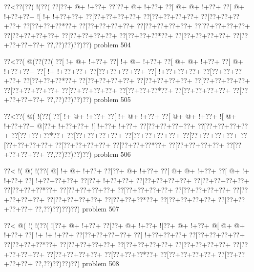 \vbox{\vbox{\goo
\0??<\0??(\0??(\- !(\0??(
\0??[\0??+\- @+\- !+\0??+
\0??[\0??+\- @+\- !+\0??+
\0??[\- @+\- @+\- !+\0??+
\0??[\- @+\- !+\0??+\0??+
\- ![\- !+\- !+\0??+\0??+
\0??[\0??+\0??+\0??+\0??+
\0??[\0??+\0??+\0??+\0??+
\0??[\0??+\0??+\0??+\0??+
\0??[\0??+\0??+\0??*\0??+
\0??[\0??+\0??+\0??+\0??+
\0??[\0??+\0??+\0??+\0??+
\0??[\0??+\0??+\0??+\0??+
\0??[\0??+\0??+\0??+\0??+
\0??[\0??+\0??+\0??+\0??+
\0??[\0??+\0??+\0??*\0??+
\0??[\0??+\0??+\0??+\0??+
\0??[\0??+\0??+\0??+\0??+
\0??,\0??)\0??)\0??)\0??)
}
\hfil problem 504\hfil\break
}

\vbox{\vbox{\goo
\0??<\0??(\- @(\0??(\0??(
\0??[\- !+\- @+\- !+\0??+
\0??[\- !+\- @+\- !+\0??+
\0??[\- @+\- @+\- !+\0??+
\0??[\- @+\- !+\0??+\0??+
\0??[\- !+\- !+\0??+\0??+
\0??[\0??+\0??+\0??+\0??+
\0??[\- !+\0??+\0??+\0??+
\0??[\0??+\0??+\0??+\0??+
\0??[\0??+\0??+\0??*\0??+
\0??[\0??+\0??+\0??+\0??+
\0??[\0??+\0??+\0??+\0??+
\0??[\0??+\0??+\0??+\0??+
\0??[\0??+\0??+\0??+\0??+
\0??[\0??+\0??+\0??+\0??+
\0??[\0??+\0??+\0??*\0??+
\0??[\0??+\0??+\0??+\0??+
\0??[\0??+\0??+\0??+\0??+
\0??,\0??)\0??)\0??)\0??)
}
\hfil problem 505\hfil\break
}

\vbox{\vbox{\goo
\0??<\0??(\- @(\- !(\0??(
\0??[\- !+\- @+\- !+\0??+
\0??[\- !+\- @+\- !+\0??+
\0??[\- @+\- @+\- !+\0??+
\- ![\- @+\- !+\0??+\0??+
\- @[\0??+\- !+\0??+\0??+
\- ![\- !+\0??+\- !+\0??+
\0??[\0??+\0??+\0??+\0??+
\0??[\0??+\0??+\0??+\0??+
\0??[\0??+\0??+\0??*\0??+
\0??[\0??+\0??+\0??+\0??+
\0??[\0??+\0??+\0??+\0??+
\0??[\0??+\0??+\0??+\0??+
\0??[\0??+\0??+\0??+\0??+
\0??[\0??+\0??+\0??+\0??+
\0??[\0??+\0??+\0??*\0??+
\0??[\0??+\0??+\0??+\0??+
\0??[\0??+\0??+\0??+\0??+
\0??,\0??)\0??)\0??)\0??)
}
\hfil problem 506\hfil\break
}

\vbox{\vbox{\goo
\0??<\- !(\- @(\- !(\0??(
\- @[\- !+\- @+\- !+\0??+
\0??[\0??+\- @+\- !+\0??+
\0??[\- @+\- @+\- !+\0??+
\0??[\- @+\- !+\- !+\0??+
\0??[\- !+\0??+\0??+\0??+
\0??[\0??+\- !+\0??+\0??+
\0??[\0??+\0??+\0??+\0??+
\0??[\0??+\0??+\0??+\0??+
\0??[\0??+\0??+\0??*\0??+
\0??[\0??+\0??+\0??+\0??+
\0??[\0??+\0??+\0??+\0??+
\0??[\0??+\0??+\0??+\0??+
\0??[\0??+\0??+\0??+\0??+
\0??[\0??+\0??+\0??+\0??+
\0??[\0??+\0??+\0??*\0??+
\0??[\0??+\0??+\0??+\0??+
\0??[\0??+\0??+\0??+\0??+
\0??,\0??)\0??)\0??)\0??)
}
\hfil problem 507\hfil\break
}

\vbox{\vbox{\goo
\0??<\- @(\- !(\- !(\0??(
\- ![\0??+\- @+\- !+\0??+
\0??[\0??+\- @+\- !+\0??+
\- ![\0??+\- @+\- !+\0??+
\- @[\- @+\- @+\- !+\0??+
\0??[\- !+\- !+\- !+\0??+
\0??[\0??+\0??+\0??+\0??+
\0??[\- !+\0??+\0??+\0??+
\0??[\0??+\0??+\0??+\0??+
\0??[\0??+\0??+\0??*\0??+
\0??[\0??+\0??+\0??+\0??+
\0??[\0??+\0??+\0??+\0??+
\0??[\0??+\0??+\0??+\0??+
\0??[\0??+\0??+\0??+\0??+
\0??[\0??+\0??+\0??+\0??+
\0??[\0??+\0??+\0??*\0??+
\0??[\0??+\0??+\0??+\0??+
\0??[\0??+\0??+\0??+\0??+
\0??,\0??)\0??)\0??)\0??)
}
\hfil problem 508\hfil\break
}

